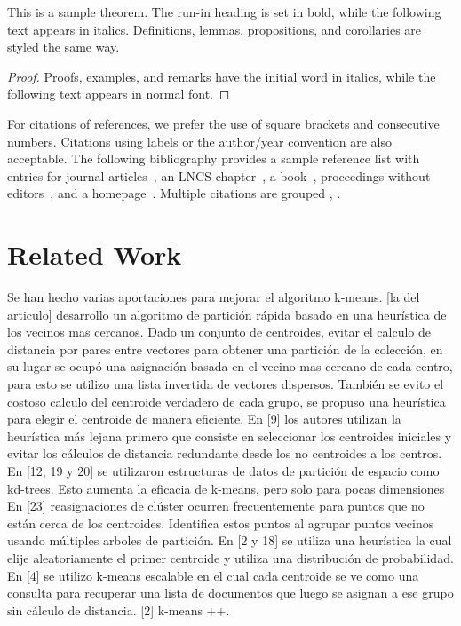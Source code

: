 \documentclass[runningheads]{llncs}
\begin{document}
\begin{theorem}
This is a sample theorem. The run-in heading is set in bold, while
the following text appears in italics. Definitions, lemmas,
propositions, and corollaries are styled the same way.
\end{theorem}
%
%
\begin{proof}
Proofs, examples, and remarks have the initial word in italics,
while the following text appears in normal font.
\end{proof}
For citations of references, we prefer the use of square brackets
and consecutive numbers. Citations using labels or the author/year
convention are also acceptable. The following bibliography provides
a sample reference list with entries for journal
articles~\cite{ref_article1}, an LNCS chapter~\cite{ref_lncs1}, a
book~\cite{ref_book1}, proceedings without editors~\cite{ref_proc1},
and a homepage~\cite{ref_url1}. Multiple citations are grouped
\cite{ref_article1,ref_lncs1,ref_book1},
\cite{ref_article1,ref_book1,ref_proc1,ref_url1}.
\section{Related Work}
Se han hecho varias aportaciones para mejorar el algoritmo k-means.
[la del articulo] desarrollo un algoritmo de partición rápida basado en una heurística de los vecinos mas cercanos. Dado un conjunto de centroides, evitar el calculo de distancia por pares entre vectores para obtener una partición de la colección, en su lugar se ocupó una asignación basada en el vecino mas cercano de cada centro, para esto se utilizo una lista invertida de vectores dispersos.
También se evito el costoso calculo del centroide verdadero de cada grupo, se propuso una heurística para elegir el centroide de manera eficiente.
En [9] los autores utilizan la heurística más lejana primero que consiste en seleccionar los centroides iniciales y evitar los cálculos de distancia redundante desde los no centroides a los centros.
En [12, 19 y 20] se utilizaron estructuras de datos de partición de espacio como kd-trees. Esto aumenta la eficacia de k-means, pero solo para pocas dimensiones
En [23] reasignaciones de clúster ocurren frecuentemente para puntos que no están cerca de los centroides. Identifica estos puntos al agrupar puntos vecinos usando múltiples arboles de partición.
En [2 y 18] se utiliza una heurística la cual elije aleatoriamente el primer centroide y utiliza una distribución de probabilidad.
En [4] se utilizo k-means escalable en el cual cada centroide se ve como una consulta para recuperar una lista de documentos que luego se asignan a ese grupo sin cálculo de distancia.
[2] k-means ++.
\end{document}
